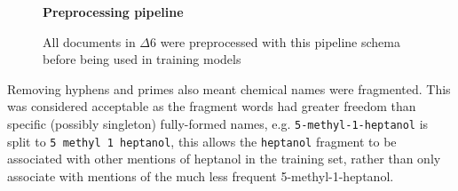 \begin{figure}[H]
    \centering
    \textbf{Preprocessing pipeline}\par\medskip
    \caption[Preprocessing Pipeline]{All documents in $\Delta6$ were preprocessed with this pipeline schema before being used in training models}
     \label{fig:SANPIPE}
\end{figure}

\newpage
Removing hyphens and primes also meant chemical names were fragmented. This was considered acceptable as the fragment words had greater freedom than specific (possibly singleton) fully-formed names, e.g. \texttt{5-methyl-1-heptanol} is split to \texttt{5 methyl 1 heptanol}, this allows the \texttt{heptanol} fragment to be associated with other mentions of heptanol in the training set, rather than only associate with mentions of the much less frequent 5-methyl-1-heptanol. 

